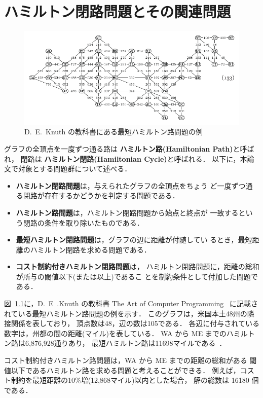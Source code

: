\chapter{ハミルトン閉路問題とその関連問題}\label{chap:background}

\begin{figure}[tb]
  \centering
  \includegraphics[width=0.9\linewidth]{fig/taocp_vol4fasc1b_p52_eq133.pdf}
  \caption{D.~E.~Knuth の教科書にある最短ハミルトン路問題の例}
  \label{fig:USmap}
\end{figure}

グラフの全頂点を一度ずつ通る路は
\textbf{ハミルトン路(Hamiltonian Path)}と呼ばれ，
閉路は
\textbf{ハミルトン閉路(Hamiltonian Cycle)}と呼ばれる．
以下に，本論文で対象とする問題群について述べる．

\begin{itemize}
\item \textbf{ハミルトン閉路問題}は，与えられたグラフの全頂点をちょう
  ど一度ずつ通る閉路が存在するかどうかを判定する問題である．
\item \textbf{ハミルトン路問題}は，ハミルトン閉路問題から始点と終点が
  一致するという閉路の条件を取り除いたものである．
\item \textbf{最短ハミルトン閉路問題}は，グラフの辺に距離が付随してい
  るとき，最短距離のハミルトン閉路を求める問題である．
\item \textbf{コスト制約付きハミルトン閉路問題}は，
  ハミルトン閉路問題に，距離の総和が所与の閾値以下(または以上)であるこ
  とを制約条件として付加した問題である\cite{comp20:Minato}．
\end{itemize}

図~\ref{fig:USmap}に，D.~E~.Knuth の教科書
The Art of Computer Programming~\cite{Knuth:TAOCP:SAT}
に記載されている最短ハミルトン路問題の例を示す．
このグラフは，米国本土48州の隣接関係を表しており，
頂点数は48，辺の数は105である．
各辺に付与されている数字は，州都の間の距離(マイル)を表している．
WA から ME までのハミルトン路は6,876,928通りあり，
最短ハミルトン路は11698マイルである~\cite{comp20:Minato}．

コスト制約付きハミルトン路問題は，WA から ME までの距離の総和がある
閾値以下であるハミルトン路を求める問題と考えることができる．
例えば，コスト制約を最短距離の10\%増(12,868マイル)以内とした場合，
解の総数は 16180 個である．

